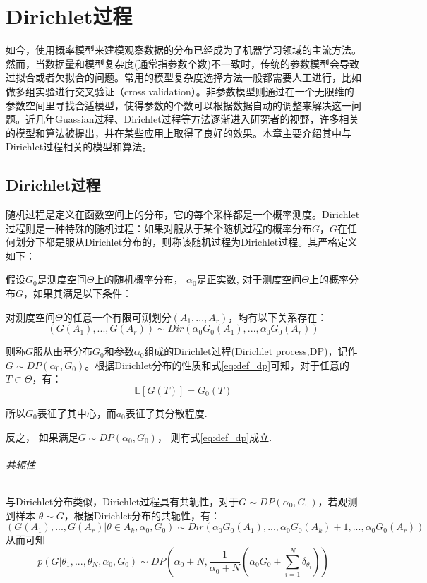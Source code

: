\chapter{Dirichlet过程}
如今，使用概率模型来建模观察数据的分布已经成为了机器学习领域的主流方法。然而，当数据量和模型复杂度(通常指参数个数)不一致时，传统的参数模型会导致过拟合或者欠拟合的问题。常用的模型复杂度选择方法一般都需要人工进行，比如做多组实验进行交叉验证（cross validation）。非参数模型则通过在一个无限维的参数空间里寻找合适模型，使得参数的个数可以根据数据自动的调整来解决这一问题。近几年Guassian过程、Dirichlet过程等方法逐渐进入研究者的视野，许多相关的模型和算法被提出，并在某些应用上取得了良好的效果。本章主要介绍其中与Dirichlet过程相关的模型和算法。
\section{Dirichlet过程}
随机过程是定义在函数空间上的分布，它的每个采样都是一个概率测度。Dirichlet过程则是一种特殊的随机过程：如果对服从于某个随机过程的概率分布$G$，$G$在任何划分下都是服从Dirichlet分布的，则称该随机过程为Dirichlet过程。其严格定义如下： 

假设$G_0$是测度空间$\Theta$上的随机概率分布， $\alpha_0$是正实数, 对于测度空间$\Theta$上的概率分布$G$，如果其满足以下条件：

对测度空间$\Theta$的任意一个有限可测划分$(A_1,...,A_r)$，均有以下关系存在：
\begin{equation}
(G(A_1),...,G(A_r)) \sim Dir(\alpha_0G_0(A_1),..., \alpha_0G_0(A_r)) \label{eq:def_dp}
\end{equation}

则称$G$服从由基分布$G_0$和参数$\alpha_0$组成的Dirichlet过程(Dirichlet process,DP)，记作$G  \sim DP(\alpha_0,G_0) $。根据Dirichlet分布的性质和式\eqref{eq:def_dp}可知，对于任意的$T \subset \Theta$，有：
\begin{equation}
\mathbb{E}[G(T)] = G_0(T) \label{eq:dp_mean_stat}
\end{equation}

所以$G_0$表征了其中心，而$a_0$表征了其分散程度.

反之， 如果满足$G  \sim DP(\alpha_0,G_0) $， 则有式\eqref{eq:def_dp}成立.

\subparagraph{共轭性}

与Dirichlet分布类似，Dirichlet过程具有共轭性，对于$G  \sim DP(\alpha_0,G_0) $，若观测到样本 $\theta \sim G$，根据Dirichlet分布的共轭性，有：
\begin{equation}
(G(A_1),...,G(A_r)|\theta \in A_k,\alpha_0,G_0) \sim Dir(\alpha_0G_0(A_1),..., \alpha_0G_0(A_k)+1,...,\alpha_0G_0(A_r)) 
\end{equation}
从而可知
\begin{equation}
p(G|\theta_1,...,\theta_N,\alpha_0,G_0) \sim DP(\alpha_0+N,\frac{1}{\alpha_0+N}(\alpha_0G_0+\sum_{i=1}^N\delta_{\theta_i})) \label{eq:dp_post}
\end{equation}

